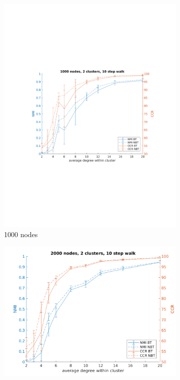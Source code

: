 \documentclass{article} %
\begin{document}
\begin{figure}[H] %
    \centering
    \begin{subfigure}{0.48\textwidth}
        \includegraphics[width=\linewidth]{fig1/N1000K2len10} 
        \caption{1000 nodes}
        \label{fig:subim11}
    \end{subfigure}
    \hfill
    \begin{subfigure}{0.48\textwidth}
        \includegraphics[width=\linewidth]{fig1/N2000K2len10}

\end{subfigure}
\end{figure}
\end{document}
